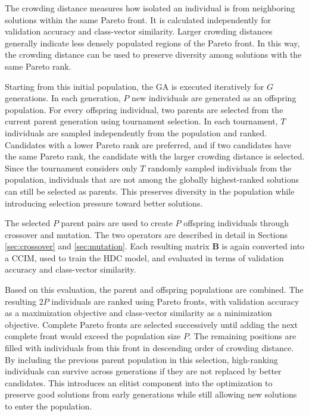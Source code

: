 The crowding distance measures how isolated an individual is from neighboring solutions within the same Pareto front. It is calculated independently for validation accuracy and class-vector similarity. Larger crowding distances generally indicate less densely populated regions of the Pareto front. In this way, the crowding distance can be used to preserve diversity among solutions with the same Pareto rank.


Starting from this initial population, the \ac{GA} is executed iteratively for $G$ generations. In each generation, $P$ new individuals are generated as an offspring population. For every offspring individual, two parents are selected from the current parent generation using tournament selection. In each tournament, $T$ individuals are sampled independently from the population and ranked. Candidates with a lower Pareto rank are preferred, and if two candidates have the same Pareto rank, the candidate with the larger crowding distance is selected. Since the tournament considers only $T$ randomly sampled individuals from the population, individuals that are not among the globally highest-ranked solutions can still be selected as parents. This preserves diversity in the population while introducing selection pressure toward better solutions.

The selected $P$ parent pairs are used to create $P$ offspring individuals through crossover and mutation. The two operators are described in detail in Sections \ref{sec:crossover} and \ref{sec:mutation}. Each resulting matrix  $\mathbf{B}$ is again converted into a \ac{CCIM}, used to train the HDC model, and evaluated in terms of validation accuracy and class-vector similarity.

Based on this evaluation, the parent and offspring populations are combined. The resulting $2P$ individuals are ranked using Pareto fronts, with validation accuracy as a maximization objective and class-vector similarity as a minimization objective. Complete Pareto fronts are selected successively until adding the next complete front would exceed the population size $P$. The remaining positions are filled with individuals from this front in descending order of crowding distance. By including the previous parent population in this selection, high-ranking individuals can survive across generations if they are not replaced by better candidates. This introduces an elitist component into the optimization to preserve good solutions from early generations while still allowing new solutions to enter the population.

